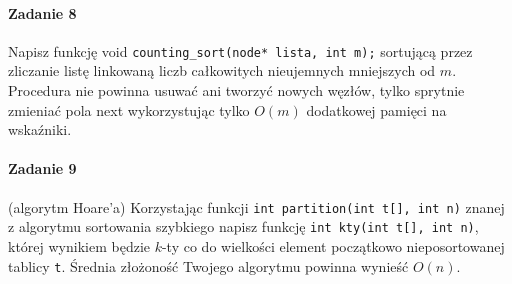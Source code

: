 \documentclass[18pt]{extarticle}
\begin{document}
\paragraph{Zadanie 8} Napisz funkcję void \verb+counting_sort(node* lista, int m);+ sortującą przez zliczanie listę linkowaną liczb całkowitych nieujemnych mniejszych od $m$. Procedura nie powinna usuwać ani tworzyć nowych węzłów, tylko sprytnie zmieniać pola next wykorzystując tylko $O(m)$ dodatkowej pamięci na wskaźniki.

\paragraph{Zadanie 9} (algorytm Hoare'a) Korzystając funkcji \verb+int partition(int t[], int n)+ znanej z algorytmu sortowania szybkiego napisz funkcję \verb+int kty(int t[], int n)+, której wynikiem będzie $k$-ty co do wielkości element początkowo nieposortowanej tablicy \verb+t+. Średnia złożoność Twojego algorytmu powinna wynieść $O(n)$.
\end{document}
